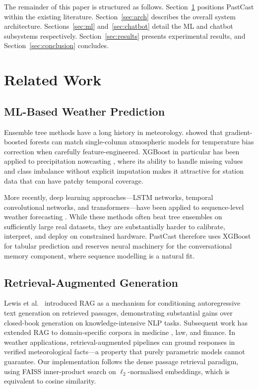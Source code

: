 \documentclass[conference]{IEEEtran}
\begin{document}
The remainder of this paper is structured as follows. Section~\ref{sec:related} positions PastCast within the existing literature. Section~\ref{sec:arch} describes the overall system architecture. Sections~\ref{sec:ml} and~\ref{sec:chatbot} detail the ML and chatbot subsystems respectively. Section~\ref{sec:results} presents experimental results, and Section~\ref{sec:conclusion} concludes.

\section{Related Work}
\label{sec:related}

\subsection{ML-Based Weather Prediction}

Ensemble tree methods have a long history in meteorology. \citet{rasp2018} showed that gradient-boosted forests can match single-column atmospheric models for temperature bias correction when carefully feature-engineered. XGBoost in particular has been applied to precipitation nowcasting \cite{shi2017}, where its ability to handle missing values and class imbalance without explicit imputation makes it attractive for station data that can have patchy temporal coverage.

More recently, deep learning approaches---LSTM networks, temporal convolutional networks, and transformers---have been applied to sequence-level weather forecasting \cite{lim2021}. While these methods often beat tree ensembles on sufficiently large real datasets, they are substantially harder to calibrate, interpret, and deploy on constrained hardware. PastCast therefore uses XGBoost for tabular prediction and reserves neural machinery for the conversational memory component, where sequence modelling is a natural fit.

\subsection{Retrieval-Augmented Generation}

Lewis et al.~\cite{lewis2020rag} introduced RAG as a mechanism for conditioning autoregressive text generation on retrieved passages, demonstrating substantial gains over closed-book generation on knowledge-intensive NLP tasks. Subsequent work has extended RAG to domain-specific corpora in medicine \cite{xiong2021}, law, and finance. In weather applications, retrieval-augmented pipelines can ground responses in verified meteorological facts---a property that purely parametric models cannot guarantee. Our implementation follows the dense passage retrieval paradigm, using FAISS inner-product search on $\ell_2$-normalised embeddings, which is equivalent to cosine similarity.
\end{document}
